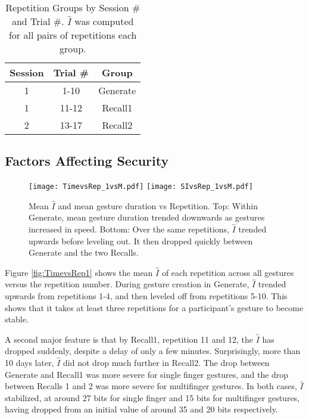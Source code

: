 \documentclass{sig-alternate-10pt}
\begin{document}
\vspace{-5 pt}
\begin{table}[!h]
\begin{center}
\begin{tabular}{ccc}


Session & Trial \# & Group \\\hline 
     1 & 1-10 & Generate \\
     1 & 11-12 & Recall1 \\
     2 & 13-17 & Recall2 \\
\end{tabular}


\end{center}
\vspace{-15 pt}
\caption{Repetition Groups by Session \# and Trial \#. $\hat I$ was computed for all pairs of repetitions each group.}
\label{tab:RepetitionGroups}
\end{table}
\vspace{-7 pt}

\subsection{Factors Affecting Security}


 \begin{figure}[!h]
  \centering
    \texttt{[image: TimevsRep\_1vsM.pdf]}
    \texttt{[image: SIvsRep\_1vsM.pdf]}

  \caption{Mean  $\hat{I}$ and mean gesture duration vs Repetition. Top: Within Generate, mean gesture duration trended downwards as gestures increased in speed. Bottom: Over the same repetitions,  $\hat{I}$ trended upwards before leveling out. It then dropped quickly between Generate and the two Recalls. }
  \label{fig:TimevsRep1}
  \label{fig:SIvsRep1}

  \end{figure}

Figure \ref{fig:TimevsRep1} shows the mean $\hat{I}$ of each repetition across all gestures versus the repetition number. During gesture creation in Generate, $\hat{I}$ trended upwards from repetitions 1-4, and then leveled off from repetitions 5-10. This shows that it takes at least three repetitions for a participant's gesture to become stable.
  
A second major feature is that by Recall1, repetition 11 and 12, the $\hat{I}$ has dropped suddenly, despite a delay of only a few minutes. Surprisingly, more than 10 days later, $\hat{I}$ did not drop much further in Recall2. The drop between Generate and Recall1 was more severe for single finger gestures, and the drop between Recalls 1 and 2 was more severe for multifinger gestures. In both cases, $\hat{I}$ stabilized, at around 27 bits for single finger and 15 bits for multifinger gestures, having dropped from an initial value of around 35 and 20 bits respectively.
  
\end{document}
